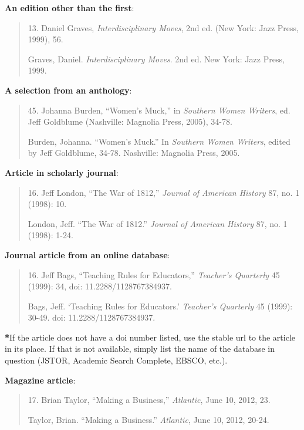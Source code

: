 \documentclass[12pt, hidelinks]{article} %
\newcommand{\tab}{\hspace*{2em}}
\begin{document}
\textbf{An edition other than the first}:

\begin{quote}
\tab 13. Daniel Graves, \emph{Interdisciplinary Moves}, 2nd ed. (New York: Jazz Press, 1999), 56.

Graves, Daniel. \emph{Interdisciplinary Moves}. 2nd ed. New York: Jazz Press, \tab 1999.
\end{quote}

\textbf{A selection from an anthology}:
\begin{quote}

\tab 45. Johanna Burden, ``Women's Muck,'' in \emph{Southern Women Writers}, ed. Jeff Goldblume (Nashville: Magnolia Press, 2005), 34-78.

Burden, Johanna. ``Women's Muck.'' In \emph{Southern Women Writers}, \tab edited by Jeff Goldblume, 
34-78. Nashville: Magnolia Press, 2005.
\end{quote}

\textbf{Article in scholarly journal}:
\begin{quote}
\tab 16. Jeff London, ``The War of 1812,'' \emph{Journal of American History} 87, no. 1 (1998): 10.

London, Jeff. ``The War of 1812.'' \emph{Journal of American History} 87, no. \tab 1 (1998): 1-24.
\end{quote}

\textbf{Journal article from an online database}:
\begin{quote}

\tab 16. Jeff Bags, ``Teaching Rules for Educators,'' \emph{Teacher's Quarterly} 45 (1999): 34, doi: 11.2288/1128767384937.

Bags, Jeff. `Teaching Rules for Educators.' \emph{Teacher's Quarterly} 45 \tab (1999): 30-49. doi: 11.2288/1128767384937.
\end{quote}

\textbf{*}If the article does not have a doi number listed, use the stable url to the article in its place. If that is not available, simply list the name of the database in question (JSTOR, Academic Search Complete, EBSCO, etc.).


\textbf{Magazine article}:
\begin{quote}
\tab 17. Brian Taylor, ``Making a Business,'' \emph{Atlantic}, June 10, 2012, 23.

Taylor, Brian. ``Making a Business.'' \emph{Atlantic}, June 10, 2012, 20-24.
\end{quote}
\end{document}
